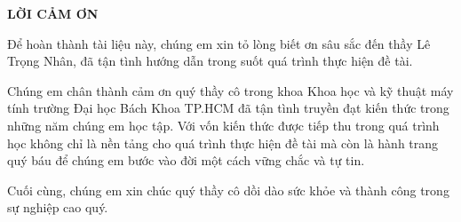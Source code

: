 \begin{center}
\bf{LỜI CẢM ƠN}
\end{center}

	Để hoàn thành tài liệu này, chúng em xin tỏ lòng biết ơn sâu sắc đến thầy Lê Trọng Nhân, đã tận tình hướng dẫn trong suốt quá trình thực hiện đề tài.

	Chúng em chân thành cảm ơn quý thầy cô trong khoa Khoa học và kỹ thuật máy tính trường Đại học Bách Khoa TP.HCM đã tận tình truyền đạt kiến thức trong những năm chúng em học tập. Với vốn kiến thức được tiếp thu trong quá trình học không chỉ là nền tảng cho quá trình thực hiện đề tài mà còn là hành trang quý báu để chúng em bước vào đời một cách vững chắc và tự tin.

	Cuối cùng, chúng em xin chúc quý thầy cô dồi dào sức khỏe và thành công trong sự nghiệp cao quý.